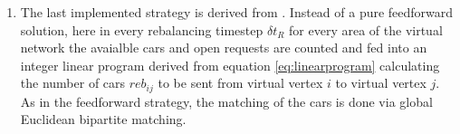 \begin{enumerate}
\item The last implemented strategy is derived from \cite{pavone2011load}. Instead of a pure feedforward solution, here in every rebalancing timestep $\delta t_R$ for every area of the virtual network the avaialble cars and open requests are counted and fed into an integer linear program derived from equation \ref{eq:linearprogram} calculating the number of cars $reb _{ij}$ to be sent from virtual vertex $i$ to virtual vertex $j$. As in the feedforward strategy, the matching of the cars is done via global Euclidean bipartite matching.
\end{enumerate}
